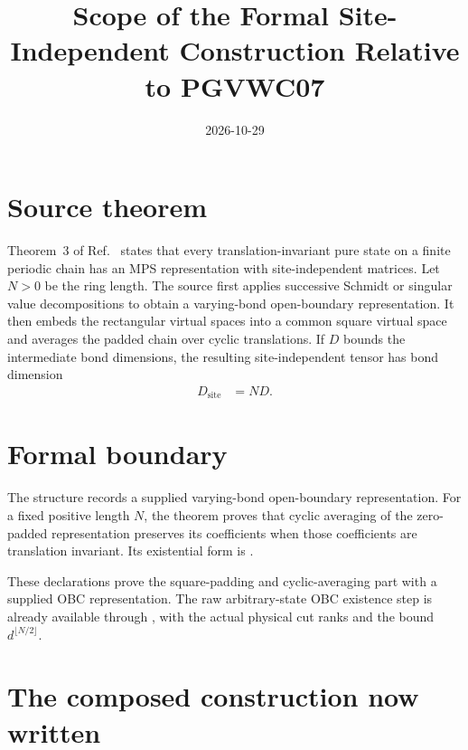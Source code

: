 \documentclass{article}
\title{Scope of the Formal Site-Independent Construction Relative to PGVWC07}
\author{}
\date{2026-10-29}
\begin{document}
\maketitle
{}

\section{Source theorem}

Theorem~3 of Ref.~\cite{PerezGarcia2007MPSReps} states that every
translation-invariant pure state on a finite periodic chain has an MPS
representation with site-independent matrices. Let $N>0$ be the ring length.
The source first applies successive Schmidt or singular value decompositions
to obtain a varying-bond open-boundary representation. It then embeds the
rectangular virtual spaces into a common square virtual space and averages the
padded chain over cyclic translations. If $D$ bounds the intermediate bond
dimensions, the resulting site-independent tensor has bond dimension
\begin{align}
    D_{\mathrm{site}}
     & = ND.
    \label{eq:pgvwc07_site_independent_scope_site_independent_bond_dimension}
\end{align}

\section{Formal boundary}

The structure  records a supplied varying-bond
open-boundary representation. For a fixed positive length $N$, the theorem
 proves that cyclic
averaging of the zero-padded representation preserves its coefficients when
those coefficients are translation invariant. Its existential form is
.

These declarations prove the square-padding and cyclic-averaging part
with a supplied OBC representation. The raw arbitrary-state OBC existence
step is already available through
, with the actual
physical cut ranks and the bound $d^{\lfloor N/2\rfloor}$.

\section{The composed construction now written}
\end{document}
